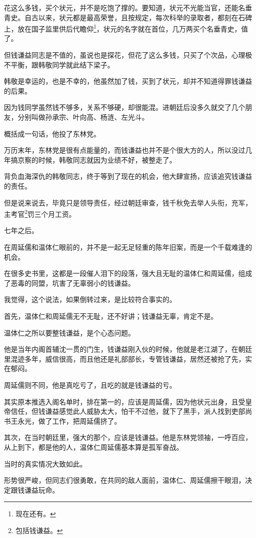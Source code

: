 \begin{multicols}{\theparacolNo}
花这么多钱，买个状元，并不是吃饱了撑的。要知道，状元不光能当官，还能名垂青史。自古以来，状元都是最高荣誉，且按规定，每次科举的录取者，都刻在石碑上，放在国子监里供后代瞻仰\footnote{现在还有。}，状元的名字就在首位，几万两买个名垂青史，值了。

但钱谦益同志是不值的，虽说也是探花，但花了这么多钱，只买了个次品，心理极不平衡，跟韩敬同学就此结下梁子。

韩敬是幸运的，也是不幸的，他虽然加了钱，买到了状元，却并不知道得罪钱谦益的后果。

因为钱同学虽然钱不够多，关系不够硬，却很能混。进朝廷后没多久就交了几个朋友，分别叫做孙承宗、叶向高、杨涟、左光斗。

概括成一句话，他投了东林党。

万历末年，东林党是很有点能量的，而钱谦益也并不是个很大方的人，所以没过几年搞京察的时候，韩敬同志就因为业绩不好，被整走了。

背负血海深仇的韩敬同志，终于等到了现在的机会，他大肆宣扬，应该追究钱谦益的责任。

但是说来说去，毕竟只是领导责任，经过朝廷审查，钱千秋免去举人头衔，充军，主考官\footnote{包括钱谦益。}罚三个月工资。

七年之后。

在周延儒和温体仁眼前的，并不是一起无足轻重的陈年旧案，而是一个千载难逢的机会。

在很多史书里，这都是一段催人泪下的段落，强大且无耻的温体仁和周延儒，组成了恶毒的同盟，坑害了无辜弱小的钱谦益。

我觉得，这个说法，如果倒转过来，是比较符合事实的。

首先，温体仁和周延儒无不无耻，还不好讲；钱谦益无辜，肯定不是。

温体仁之所以要整钱谦益，是个心态问题。

他是当年内阁首辅沈一贯的门生，钱谦益刚入伙的时候，他就是老江湖了，在朝廷里混迹多年，威信很高，而且他还是礼部部长，专管钱谦益，居然还被抢了先，实在郁闷。

周延儒则不同，他是真吃亏了，且吃的就是钱谦益的亏。

其实原本推选入阁名单时，排在第一的，应该是周延儒，因为他状元出身，且受皇帝信任，但钱谦益感觉此人威胁太大，怕干不过他，就下了黑手，派人找到吏部尚书王永光，做了工作，把周延儒挤了。

其次，在当时朝廷里，强大的那个，应该是钱谦益。他是东林党领袖，一呼百应，从上到下，都是他的人，温体仁周延儒基本算是孤军奋战。

当时的真实情况大致如此。

形势很严峻，但同志们很勇敢，在共同的敌人面前，温体仁、周延儒擦干眼泪，决定跟钱谦益玩命。


\end{multicols}
